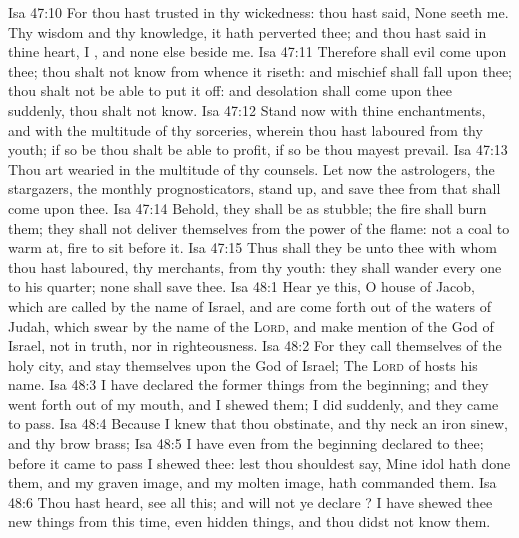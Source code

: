 \vs Isa 47:10 For thou hast trusted in thy wickedness: thou hast said, None seeth me. Thy wisdom and thy knowledge, it hath perverted thee; and thou hast said in thine heart, I , and none else beside me.
\vs Isa 47:11 Therefore shall evil come upon thee; thou shalt not know from whence it riseth: and mischief shall fall upon thee; thou shalt not be able to put it off: and desolation shall come upon thee suddenly,  thou shalt not know.
\vs Isa 47:12 Stand now with thine enchantments, and with the multitude of thy sorceries, wherein thou hast laboured from thy youth; if so be thou shalt be able to profit, if so be thou mayest prevail.
\vs Isa 47:13 Thou art wearied in the multitude of thy counsels. Let now the astrologers, the stargazers, the monthly prognosticators, stand up, and save thee from  that shall come upon thee.
\vs Isa 47:14 Behold, they shall be as stubble; the fire shall burn them; they shall not deliver themselves from the power of the flame:  not  a coal to warm at,  fire to sit before it.
\vs Isa 47:15 Thus shall they be unto thee with whom thou hast laboured,  thy merchants, from thy youth: they shall wander every one to his quarter; none shall save thee.
\vs Isa 48:1 Hear ye this, O house of Jacob, which are called by the name of Israel, and are come forth out of the waters of Judah, which swear by the name of the \textsc{Lord}, and make mention of the God of Israel,  not in truth, nor in righteousness.
\vs Isa 48:2 For they call themselves of the holy city, and stay themselves upon the God of Israel; The \textsc{Lord} of hosts  his name.
\vs Isa 48:3 I have declared the former things from the beginning; and they went forth out of my mouth, and I shewed them; I did  suddenly, and they came to pass.
\vs Isa 48:4 Because I knew that thou  obstinate, and thy neck  an iron sinew, and thy brow brass;
\vs Isa 48:5 I have even from the beginning declared  to thee; before it came to pass I shewed  thee: lest thou shouldest say, Mine idol hath done them, and my graven image, and my molten image, hath commanded them.
\vs Isa 48:6 Thou hast heard, see all this; and will not ye declare ? I have shewed thee new things from this time, even hidden things, and thou didst not know them.
